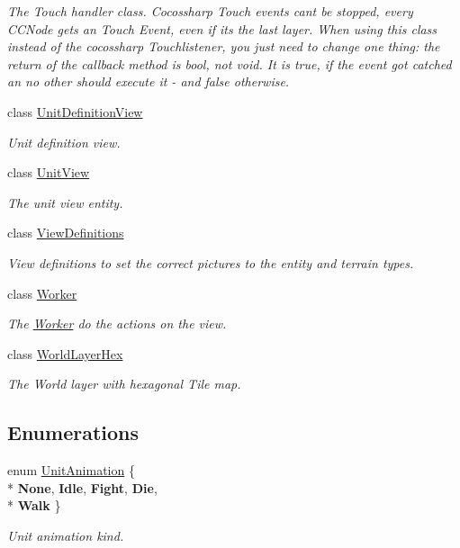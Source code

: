 \begin{DoxyCompactItemize}
\begin{DoxyCompactList}\small\item\em The Touch handler class. Cocossharp Touch events can\textquotesingle{}t be stopped, every C\+C\+Node gets an Touch Event, even if it\textquotesingle{}s the last layer. When using this class instead of the cocossharp Touchlistener, you just need to change one thing\+: the return of the callback method is bool, not void. It is true, if the event got catched an no other should execute it -\/ and false otherwise. \end{DoxyCompactList}\item 
class \hyperlink{classClient_1_1Common_1_1Views_1_1UnitDefinitionView}{Unit\+Definition\+View}
\begin{DoxyCompactList}\small\item\em Unit definition view. \end{DoxyCompactList}\item 
class \hyperlink{classClient_1_1Common_1_1Views_1_1UnitView}{Unit\+View}
\begin{DoxyCompactList}\small\item\em The unit view entity. \end{DoxyCompactList}\item 
class \hyperlink{classClient_1_1Common_1_1Views_1_1ViewDefinitions}{View\+Definitions}
\begin{DoxyCompactList}\small\item\em View definitions to set the correct pictures to the entity and terrain types. \end{DoxyCompactList}\item 
class \hyperlink{classClient_1_1Common_1_1Views_1_1Worker}{Worker}
\begin{DoxyCompactList}\small\item\em The \hyperlink{classClient_1_1Common_1_1Views_1_1Worker}{Worker} do the actions on the view. \end{DoxyCompactList}\item 
class \hyperlink{classClient_1_1Common_1_1Views_1_1WorldLayerHex}{World\+Layer\+Hex}
\begin{DoxyCompactList}\small\item\em The World layer with hexagonal Tile map. \end{DoxyCompactList}\end{DoxyCompactItemize}
\subsection*{Enumerations}
\begin{DoxyCompactItemize}
\item 
enum \hyperlink{namespaceClient_1_1Common_1_1Views_a6974b9f5798be7fa135e7517fa41ffe0}{Unit\+Animation} \{ \\*
{\bfseries None}, 
{\bfseries Idle}, 
{\bfseries Fight}, 
{\bfseries Die}, 
\\*
{\bfseries Walk}
 \}\begin{DoxyCompactList}\small\item\em Unit animation kind. \end{DoxyCompactList}
\end{DoxyCompactItemize}


